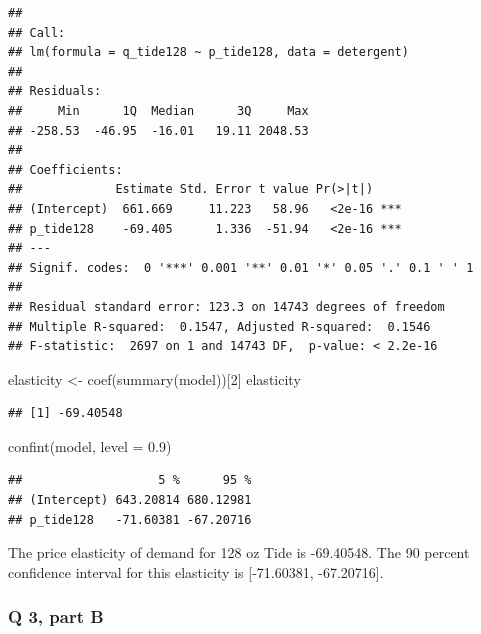 \documentclass[
]{article}
\newenvironment{Shaded}{\begin{snugshade}}{\end{snugshade}}
\newcommand{\AttributeTok}[1]{\textcolor[rgb]{0.77,0.63,0.00}{#1}}
\newcommand{\DecValTok}[1]{\textcolor[rgb]{0.00,0.00,0.81}{#1}}
\newcommand{\FloatTok}[1]{\textcolor[rgb]{0.00,0.00,0.81}{#1}}
\newcommand{\FunctionTok}[1]{\textcolor[rgb]{0.00,0.00,0.00}{#1}}
\newcommand{\NormalTok}[1]{#1}
\newcommand{\OtherTok}[1]{\textcolor[rgb]{0.56,0.35,0.01}{#1}}
\begin{document}
\begin{verbatim}
## 
## Call:
## lm(formula = q_tide128 ~ p_tide128, data = detergent)
## 
## Residuals:
##     Min      1Q  Median      3Q     Max 
## -258.53  -46.95  -16.01   19.11 2048.53 
## 
## Coefficients:
##             Estimate Std. Error t value Pr(>|t|)    
## (Intercept)  661.669     11.223   58.96   <2e-16 ***
## p_tide128    -69.405      1.336  -51.94   <2e-16 ***
## ---
## Signif. codes:  0 '***' 0.001 '**' 0.01 '*' 0.05 '.' 0.1 ' ' 1
## 
## Residual standard error: 123.3 on 14743 degrees of freedom
## Multiple R-squared:  0.1547, Adjusted R-squared:  0.1546 
## F-statistic:  2697 on 1 and 14743 DF,  p-value: < 2.2e-16
\end{verbatim}

\begin{Shaded}
\begin{Highlighting}[]
\NormalTok{elasticity }\OtherTok{\textless{}{-}} \FunctionTok{coef}\NormalTok{(}\FunctionTok{summary}\NormalTok{(model))[}\DecValTok{2}\NormalTok{]}
\NormalTok{elasticity}
\end{Highlighting}
\end{Shaded}

\begin{verbatim}
## [1] -69.40548
\end{verbatim}

\begin{Shaded}
\begin{Highlighting}[]
\FunctionTok{confint}\NormalTok{(model, }\AttributeTok{level =} \FloatTok{0.9}\NormalTok{)}
\end{Highlighting}
\end{Shaded}

\begin{verbatim}
##                   5 %      95 %
## (Intercept) 643.20814 680.12981
## p_tide128   -71.60381 -67.20716
\end{verbatim}

The price elasticity of demand for 128 oz Tide is -69.40548. The 90
percent confidence interval for this elasticity is {[}-71.60381,
-67.20716{]}.

\hypertarget{q-3-part-b}{%
\subsubsection{Q 3, part B}\label{q-3-part-b}}
\end{document}
